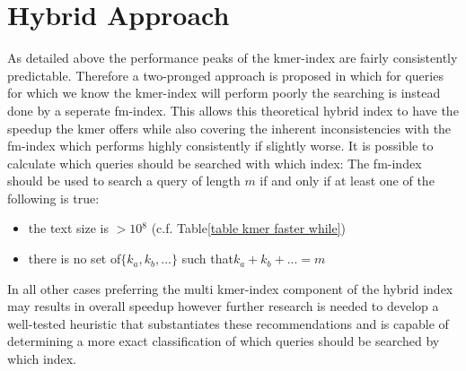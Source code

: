 \section{Hybrid Approach}
As detailed above the performance peaks of the kmer-index are fairly
consistently predictable. Therefore a two-pronged approach is proposed in which
for queries for which we know the kmer-index will perform poorly the
searching is instead done by a seperate fm-index. This allows this theoretical hybrid index
to have the speedup the kmer offers while also covering the inherent inconsistencies with the fm-index
which performs highly consistently if slightly worse. It is possible to calculate
which queries should be searched with which index: The fm-index should be used to
search a query of length $m$ if and only if at least one of the following is true:
\begin{itemize}
\item the text size is $>10{{}^8}$ (c.f. Table\ref{table kmer faster while})
\item there is no set of$\{k_{a},k_{b},...\}$ such that$k_{a}+k_{b}+...=m$
\end{itemize}
In all other cases preferring the multi kmer-index component of the hybrid index
may results in overall speedup however further research is needed to develop a well-tested
heuristic that substantiates these recommendations and is capable of determining a more
exact classification of which queries should be searched by which index.


